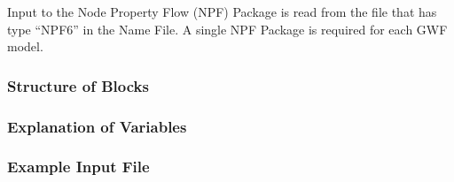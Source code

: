 Input to the Node Property Flow (NPF) Package is read from the file that has type ``NPF6'' in the Name File.  A single NPF Package is required for each GWF model. 

\vspace{5mm}
\subsubsection{Structure of Blocks}



\vspace{5mm}
\subsubsection{Explanation of Variables}
\begin{description}

\end{description}

\vspace{5mm}
\subsubsection{Example Input File}


